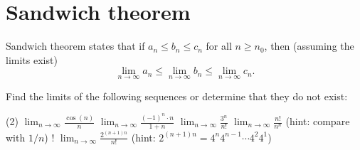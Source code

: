 \documentclass{discussion}
\begin{document}
\section{Sandwich theorem}

Sandwich theorem states that if \(a_n \leq b_n \leq c_n\) for all \(n \geq n_0\), then (assuming the limits exist)
\begin{equation*}
    \lim_{n\to \infty} a_n \leq \lim_{n\to \infty} b_n \leq \lim_{n\to \infty} c_n.
\end{equation*}

\begin{question}
    Find the limits of the following sequences or determine that they do not exist:
    \begin{tasks}(2)
        \task \(\displaystyle \lim_{n\to \infty} \frac{\cos(n)}{n}\)
        \task \(\displaystyle \lim_{n\to \infty} \frac{(-1)^n \cdot n}{1 + n}\)
        \task \(\displaystyle \lim_{n\to \infty} \frac{3^n}{n!}\)
        \task \(\displaystyle \lim_{n\to \infty} \frac{n!}{n^n}\) (hint: compare with \(1/n\))
        \task! \(\displaystyle \lim_{n\to \infty} \frac{2^{(n+1)n}}{n!}\) (hint: \(2^{(n+1)n} = 4^{n} 4^{n-1} \cdots 4^2 4^1\))
    \end{tasks}
\end{question}
\end{document}
